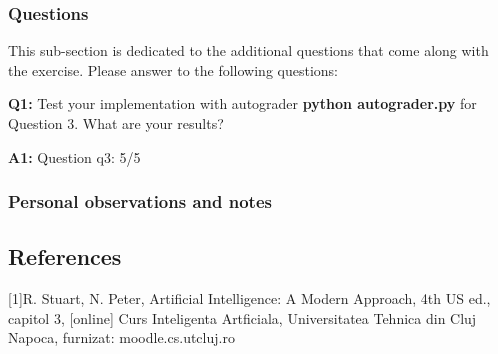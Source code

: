 \subsubsection{Questions}
This sub-section is dedicated to the additional questions that come along with the exercise. Please answer to the following questions:\newline


\textbf{Q1:} Test your implementation with autograder \textbf{python autograder.py} for Question 3. What are your results?

\textbf{A1:} Question q3: 5/5

\subsubsection{Personal observations and notes}

\vspace{0.75cm}

\subsection{References}
[1]R. Stuart, N. Peter, Artificial Intelligence: A Modern Approach, 4th US ed., capitol 3, [online] \newline
[2]Curs Inteligenta Artficiala, Universitatea Tehnica din Cluj Napoca, furnizat: moodle.cs.utcluj.ro